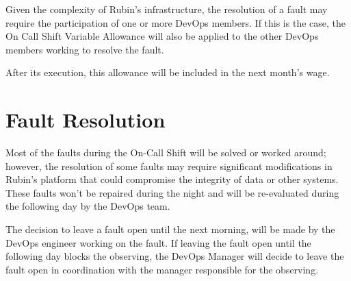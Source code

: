 Given the complexity of Rubin’s infrastructure, the resolution of a fault may require the participation of one or more DevOps members. If this is the case, the On Call Shift Variable Allowance will also be applied to the other DevOps members working to resolve the fault. 

After its execution, this allowance will be included in the next month's wage.


\section{Fault Resolution}

Most of the faults during the On-Call Shift will be solved or worked around; however, the resolution of some faults may require significant modifications in Rubin’s platform that could compromise the integrity of data or other systems. These faults won’t be repaired during the night and will be re-evaluated during the following day by the DevOps team.

The decision to leave a fault open until the next morning, will be made by the DevOps engineer working on the fault. If leaving the fault open until the following day blocks the observing, the DevOps Manager will decide to leave the fault open in coordination with the manager responsible for the observing.  
